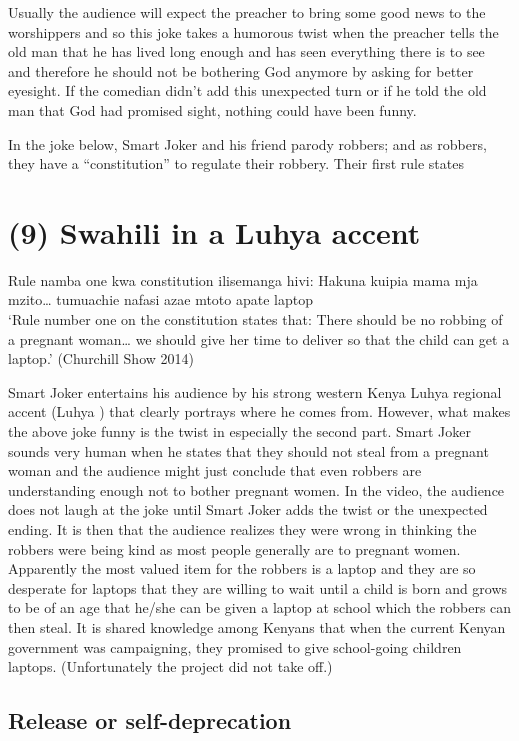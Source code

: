 \documentclass[output=paper]{langsci/langscibook}
\begin{document}
Usually the audience will expect the preacher to bring some good news to the worshippers and so this joke takes a humorous twist when the preacher tells the old man that he has lived long enough and has seen everything there is to see and therefore he should not be bothering God anymore by asking for better eyesight. If the comedian didn’t add this unexpected turn or if he told the old man that God had promised sight, nothing could have been funny. 

In the joke below, Smart Joker and his friend parody robbers; and as robbers, they have a “constitution” to regulate their robbery. Their first rule states

\chapter{(9) Swahili in a Luhya accent}
\gll Rule namba one kwa constitution ilisemanga hivi: Hakuna kuipia mama mja mzito… tumuachie nafasi azae mtoto apate laptop\\
\glt ‘Rule number one on the constitution states that: There should be no robbing of a pregnant woman… we should give her time to deliver so that the child can get a laptop.’ (Churchill Show 2014)
\z

Smart Joker entertains his audience by his strong western Kenya Luhya regional accent (Luhya ) that clearly portrays where he comes from. However, what makes the above joke funny is the twist in especially the second part. Smart Joker sounds very human when he states that they should not steal from a pregnant woman and the audience might just conclude that even robbers are understanding enough not to bother pregnant women. In the video, the audience does not laugh at the joke until Smart Joker adds the twist or the unexpected ending. It is then that the audience realizes they were wrong in thinking the robbers were being kind as most people generally are to pregnant women. Apparently the most valued item for the robbers is a laptop and they are so desperate for laptops that they are willing to wait until a child is born and grows to be of an age that he/she can be given a laptop at school which the robbers can then steal. It is shared knowledge among Kenyans that when the current Kenyan government was campaigning, they promised to give school-going children laptops. (Unfortunately the project did not take off.) 

\section{Release or self-deprecation}
\end{document}
